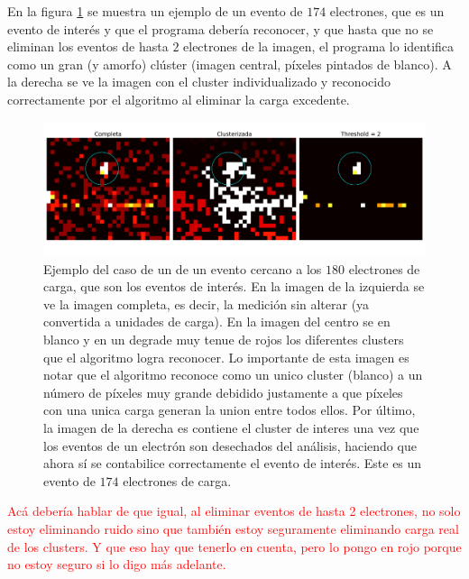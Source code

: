 \indent En la figura \ref{fig:ClusterPegoteado} se muestra un ejemplo de un evento de $174$ electrones, que es un evento de interés y que el programa debería reconocer, y que hasta que no se eliminan los eventos de hasta $2$ electrones de la imagen, el programa lo identifica como un gran (y amorfo) clúster (imagen central, píxeles pintados de blanco). A la derecha se ve la imagen con el cluster individualizado y reconocido correctamente por el algoritmo al eliminar la carga excedente.
\begin{figure}[H]
    \centering
    \includegraphics[scale=0.4]{Figs/despegoteo_clusters.pdf}
    \caption{\footnotesize{Ejemplo del caso de un de un evento cercano a los $180$ electrones de carga, que son los eventos de interés. En la imagen de la izquierda se ve la imagen completa, es decir, la medición sin alterar (ya convertida a unidades de carga). En la imagen del centro se en blanco y en un degrade muy tenue de rojos los diferentes clusters que el algoritmo logra reconocer. Lo importante de esta imagen es notar que el algoritmo reconoce como un unico cluster (blanco) a un número de píxeles muy grande debidido justamente a que píxeles con una unica carga generan la union entre todos ellos. Por último, la imagen de la derecha es contiene el cluster de interes una vez que los eventos de un electrón son desechados del análisis, haciendo que ahora sí se contabilice correctamente el evento de interés. Este es un evento de $174$ electrones de carga.}}
    \label{fig:ClusterPegoteado}
\end{figure}
\textcolor{red}{Acá debería hablar de que igual, al eliminar eventos de hasta 2 electrones, no solo estoy eliminando ruido sino que también estoy seguramente eliminando carga real de los clusters. Y que eso hay que tenerlo en cuenta, pero lo pongo en rojo porque no estoy seguro si lo digo más adelante.}\\
